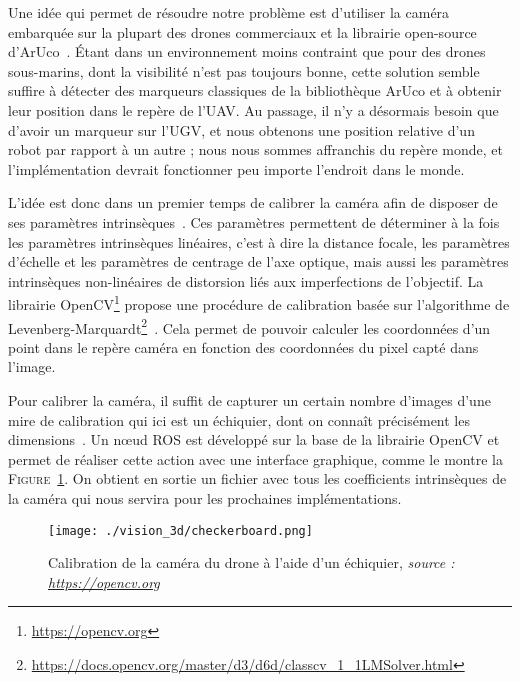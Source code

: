     Une idée qui permet de résoudre notre problème est d’utiliser la caméra embarquée sur la plupart des drones commerciaux et la librairie open-source d’ArUco~\cite{kurosu2018human, campilho2018image}. Étant dans un environnement moins contraint que pour des drones sous-marins, dont la visibilité n’est pas toujours bonne, cette solution semble suffire à détecter des marqueurs classiques de la bibliothèque ArUco et à obtenir leur position dans le repère de l’UAV. Au passage, il n’y a désormais besoin que d’avoir un marqueur sur l’UGV, et nous obtenons une position relative d’un robot par rapport à un autre ; nous nous sommes affranchis du repère monde, et l’implémentation devrait fonctionner peu importe l’endroit dans le monde.

    L’idée est donc dans un premier temps de calibrer la caméra afin de disposer de ses paramètres intrinsèques~\cite{corke2017robotics}. Ces paramètres permettent de déterminer à la fois les paramètres intrinsèques linéaires, c’est à dire la distance focale, les paramètres d'échelle et les paramètres de centrage de l’axe optique, mais aussi les paramètres intrinsèques non-linéaires de distorsion liés aux imperfections de l’objectif. La librairie OpenCV\footnote{\url{https://opencv.org}} propose une procédure de calibration basée sur l’algorithme de Levenberg-Marquardt\footnote{\url{https://docs.opencv.org/master/d3/d6d/classcv_1_1LMSolver.html}}~\cite{kurosu2018human, corke2017robotics}. Cela permet de pouvoir calculer les coordonnées d’un point dans le repère caméra en fonction des coordonnées du pixel capté dans l’image.

    Pour calibrer la caméra, il suffit de capturer un certain nombre d'images d’une mire de calibration qui ici est un échiquier, dont on connaît précisément les dimensions~\cite{corke2017robotics}. Un nœud ROS est développé sur la base de la librairie OpenCV et permet de réaliser cette action avec une interface graphique, comme le montre la \textsc{Figure}~\ref{fig:checkerboard}. On obtient en sortie un fichier avec tous les coefficients intrinsèques de la caméra qui nous servira pour les prochaines implémentations.

    \begin{figure}[!htb]
        \centering
        \texttt{[image: ./vision\_3d/checkerboard.png]}
        \caption{Calibration de la caméra du drone à l'aide d'un échiquier, \textit{source : \url{https://opencv.org}}}
        \label{fig:checkerboard}
    \end{figure}


